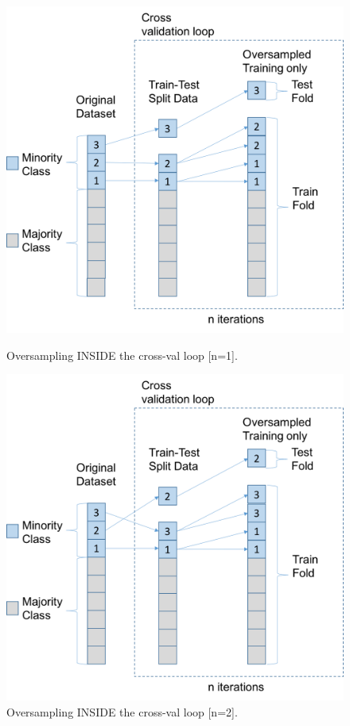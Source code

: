 \documentclass[12pt,a4paper,twoside]{report}
\begin{document}
\begin{figure}[!htbp]
\centering
\includegraphics[scale=0.6]{oversample-after-1}
\caption{Oversampling INSIDE the cross-val loop [n=1].}
\label{fig:oversample-after-1}

\centering
\includegraphics[scale=0.6]{oversample-after-2}
\caption{Oversampling INSIDE the cross-val loop [n=2].}
\label{fig:oversample-after-2}
\end{figure}
\end{document}
